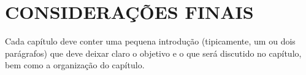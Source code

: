 
\chapter{CONSIDERAÇÕES FINAIS}
\label{chap:consideracoes-finais}
Cada capítulo deve conter uma pequena introdução (tipicamente, um ou dois parágrafos) que deve deixar claro o objetivo e o que será discutido no capítulo, bem como a organização do capítulo.
